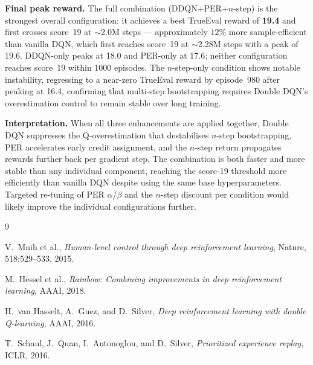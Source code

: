 \documentclass[12pt, a4paper]{report}
\begin{document}
\textbf{Final peak reward.}
The full combination (DDQN+PER+$n$-step) is the strongest overall configuration: it achieves
a best TrueEval reward of \textbf{19.4} and first crosses score~19 at $\sim$2.0M steps ---
approximately $12\%$ more sample-efficient than vanilla DQN, which first reaches score~19 at
$\sim$2.28M steps with a peak of 19.6.
DDQN-only peaks at 18.0 and PER-only at 17.6; neither configuration reaches score~19 within
1000 episodes.
The $n$-step-only condition shows notable instability, regressing to a near-zero TrueEval
reward by episode~980 after peaking at 16.4, confirming that multi-step bootstrapping requires
Double DQN's overestimation control to remain stable over long training.

\textbf{Interpretation.}
When all three enhancements are applied together, Double DQN suppresses the Q-overestimation
that destabilises $n$-step bootstrapping, PER accelerates early credit assignment, and the
$n$-step return propagates rewards further back per gradient step.
The combination is both faster and more stable than any individual component, reaching the
score-19 threshold more efficiently than vanilla DQN despite using the same base
hyperparameters.
Targeted re-tuning of PER $\alpha$/$\beta$ and the $n$-step discount per condition would
likely improve the individual configurations further.

\begin{thebibliography}{9}

V.~Mnih et al.,
\textit{Human-level control through deep reinforcement learning},
Nature, 518:529--533, 2015.

M.~Hessel et al.,
\textit{Rainbow: Combining improvements in deep reinforcement learning},
AAAI, 2018.

H.~van Hasselt, A.~Guez, and D.~Silver,
\textit{Deep reinforcement learning with double Q-learning},
AAAI, 2016.

T.~Schaul, J.~Quan, I.~Antonoglou, and D.~Silver,
\textit{Prioritized experience replay},
ICLR, 2016.

\end{thebibliography}
\end{document}
